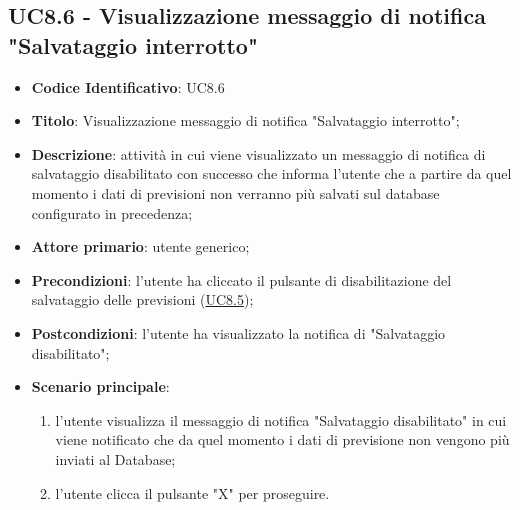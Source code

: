 	\subsection{UC8.6 - Visualizzazione messaggio di notifica "Salvataggio interrotto"}
	\begin{itemize}
			\item\textbf{Codice Identificativo}: UC8.6
			\item\textbf{Titolo}: Visualizzazione messaggio di notifica "Salvataggio interrotto";
			\item\textbf{Descrizione}: attività in cui viene visualizzato un messaggio di notifica di salvataggio disabilitato con successo che informa l'utente che a partire da quel momento i dati di previsioni non verranno più salvati sul database configurato in precedenza;
			\item\textbf{Attore primario}: utente generico;
			\item\textbf{Precondizioni}: l'utente ha cliccato il pulsante di disabilitazione del salvataggio delle previsioni (\hyperref[par:UC8.5]{UC8.5});
			\item\textbf{Postcondizioni}: l'utente ha visualizzato la notifica di "Salvataggio disabilitato";
			\item\textbf{Scenario principale}:
				\begin{enumerate}
					\item l'utente visualizza il messaggio di notifica "Salvataggio disabilitato" in cui viene notificato che da quel momento i dati di previsione non vengono più inviati al Database;
					\item l'utente clicca il pulsante "X" per proseguire.		
				\end{enumerate}		
		\end{itemize}
		



	\label{par:UC9}
